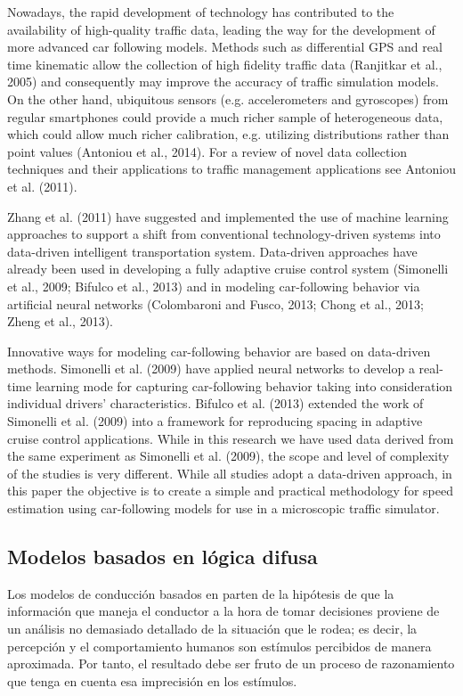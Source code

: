 Nowadays, the rapid development of technology has contributed to the availability of high-quality traffic data, leading the way for the development of more advanced car following models. Methods such as differential GPS and real time kinematic allow the collection of high fidelity traffic data (Ranjitkar et al., 2005) and consequently may improve the accuracy of traffic simulation models. On the other hand, ubiquitous sensors (e.g. accelerometers and gyroscopes) from regular smartphones could provide a much richer sample of heterogeneous data, which could allow much richer calibration, e.g. utilizing distributions rather than point values (Antoniou et al., 2014). For a review of novel data collection techniques and their applications to traffic management applications see Antoniou et al. (2011).

Zhang et al. (2011) have suggested and implemented the use of machine learning approaches to support a shift from conventional technology-driven systems into data-driven intelligent transportation system. Data-driven approaches have already been used in developing a fully adaptive cruise control system (Simonelli et al., 2009; Bifulco et al., 2013) and in modeling car-following behavior via artificial neural networks (Colombaroni and Fusco, 2013; Chong et al., 2013; Zheng et al., 2013).

Innovative ways for modeling car-following behavior are based on data-driven methods. Simonelli et al. (2009) have applied neural networks to develop a real-time learning mode for capturing car-following behavior taking into consideration individual drivers’ characteristics. Bifulco et al. (2013) extended the work of Simonelli et al. (2009) into a framework for reproducing spacing in adaptive cruise control applications. While in this research we have used data derived from the same experiment as Simonelli et al. (2009), the scope and level of complexity of the studies is very different. While all studies adopt a data-driven approach, in this paper the objective is to create a simple and practical methodology for speed estimation using car-following models for use in a microscopic traffic simulator.

\subsection{Modelos basados en lógica difusa}

Los modelos de conducción basados en  parten de la hipótesis de que la información que maneja el conductor a la hora de tomar decisiones proviene de un análisis no demasiado detallado de la situación que le rodea; es decir, la percepción y el comportamiento humanos son estímulos percibidos de manera aproximada. Por tanto, el resultado debe ser fruto de un proceso de razonamiento que tenga en cuenta esa imprecisión en los estímulos.

